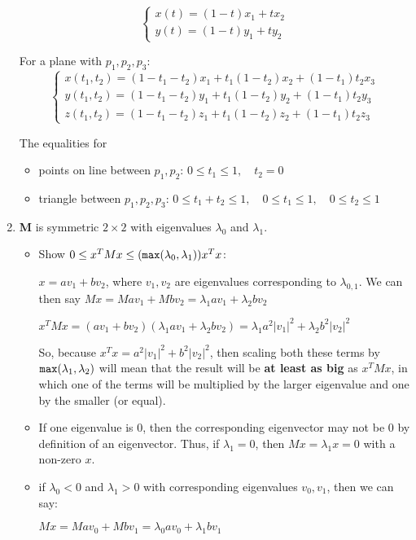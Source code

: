\documentclass{article}
\begin{document}
\begin{enumerate}
	\[ \left\{ \begin{array}{l}
		x(t) = (1-t)x_1+tx_2 \\
		y(t) = (1-t)y_1+ty_2 
	\end{array} \right. \]
	
	For a plane with $p_1,p_2,p_3$:
	\[ \left\{ \begin{array}{l}
	x(t_1,t_2)=(1-t_1-t_2)x_1+t_1(1-t_2)x_2+(1-t_1)t_2x_3 \\
	y(t_1,t_2)=(1-t_1-t_2)y_1+t_1(1-t_2)y_2+(1-t_1)t_2y_3 \\
	z(t_1,t_2)=(1-t_1-t_2)z_1+t_1(1-t_2)z_2+(1-t_1)t_2z_3 
\end{array} \right.
	\]

The equalities for 
\begin{itemize}
	\item points on line between $p_1,p_2$: $0\leq t_1 \leq 1, \quad t_2=0$
	
	\item triangle between $p_1,p_2,p_3$: $0\leq t_1+t_2 \leq 1, \quad 0\leq t_1\leq 1, \quad 0\leq t_2 \leq 1$
\end{itemize}
	
 \item {\bf M}  is symmetric $2\times 2$ with eigenvalues $\lambda_0$ and $\lambda_1$.

\begin{itemize}
	\item Show $0\leq x^TMx\leq (\verb+max+(\lambda_0,\lambda_1))x^Tx$:
	
	\begin{center}
		$x=av_1+bv_2$, where $v_1,v_2$ are eigenvalues corresponding to $\lambda_{0,1}$. We can then say $Mx=Mav_1+Mbv_2 = \lambda_1av_1+\lambda_2bv_2$
		
		$x^TMx=(av_1+bv_2)(\lambda_1 av_1 +\lambda_2bv_2) = \lambda_1a^2|v_1|^2+\lambda_2b^2|v_2|^2$ 
		
		So, because $x^Tx=a^2|v_1|^2+b^2|v_2|^2$, then scaling both these terms by $\verb+max+(\lambda_1,\lambda_2)$ will mean that the result will be {\bf at least as big} as $x^TMx$, in which one of the terms will be multiplied by the larger eigenvalue and one by the smaller (or equal).
	\end{center}
	\item If one eigenvalue is 0, then the corresponding eigenvector may not be 0 by definition of an eigenvector. Thus, if $\lambda_1=0$, then $Mx=\lambda_1x=0$ with a non-zero $x$.
	
	\item if $\lambda_0<0$ and $\lambda_1>0$ with corresponding eigenvalues $v_0,v_1$, then we can say:
	\begin{center}
		$Mx=Mav_0+Mbv_1 = \lambda_0av_0+\lambda_1bv_1$
		

\end{center}
\end{itemize}
\end{enumerate}
\end{document}
